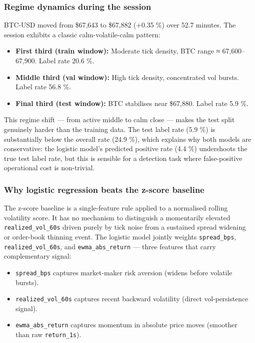 \documentclass[
]{article}
\providecommand{\tightlist}{%
  \setlength{\itemsep}{0pt}\setlength{\parskip}{0pt}}
\begin{document}
\hypertarget{regime-dynamics-during-the-session}{%
\subsubsection{Regime dynamics during the
session}\label{regime-dynamics-during-the-session}}

BTC-USD moved from \$67,643 to \$67,882 (+0.35 \%) over 52.7 minutes.
The session exhibits a classic calm-volatile-calm pattern:

\begin{itemize}
\tightlist
\item
  \textbf{First third (train window):} Moderate tick density, BTC range
  ≈ 67,600--67,900. Label rate 20.6 \%.
\item
  \textbf{Middle third (val window):} High tick density, concentrated
  vol bursts. Label rate 56.8 \%.
\item
  \textbf{Final third (test window):} BTC stabilises near \$67,880.
  Label rate 5.9 \%.
\end{itemize}

This regime shift --- from active middle to calm close --- makes the
test split genuinely harder than the training data. The test label rate
(5.9 \%) is substantially below the overall rate (24.9 \%), which
explains why both models are conservative: the logistic model's
predicted positive rate (4.4 \%) undershoots the true test label rate,
but this is sensible for a detection task where false-positive
operational cost is non-trivial.

\hypertarget{why-logistic-regression-beats-the-z-score-baseline}{%
\subsubsection{Why logistic regression beats the z-score
baseline}\label{why-logistic-regression-beats-the-z-score-baseline}}

The z-score baseline is a single-feature rule applied to a normalised
rolling volatility score. It has no mechanism to distinguish a
momentarily elevated \texttt{realized\_vol\_60s} driven purely by tick
noise from a sustained spread widening or order-book thinning event. The
logistic model jointly weights \texttt{spread\_bps},
\texttt{realized\_vol\_60s}, and \texttt{ewma\_abs\_return} --- three
features that carry complementary signal:

\begin{itemize}
\tightlist
\item
  \texttt{spread\_bps} captures market-maker risk aversion (widens
  before volatile bursts).
\item
  \texttt{realized\_vol\_60s} captures recent backward volatility
  (direct vol-persistence signal).
\item
  \texttt{ewma\_abs\_return} captures momentum in absolute price moves
  (smoother than raw \texttt{return\_1s}).
\end{itemize}
\end{document}
